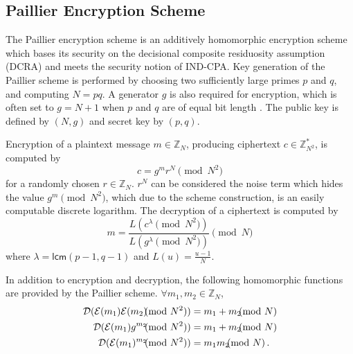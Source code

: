 \documentclass[twocolumn]{autart}
\begin{document}
% 
% 

\subsection{Paillier Encryption Scheme} \label{subsec:paillier_scheme}
The Paillier encryption scheme \cite{paillierPublicKeyCryptosystemsBased1999} is an additively homomorphic encryption scheme which bases its security on the decisional composite residuosity assumption (DCRA) and meets the security notion of IND-CPA. Key generation of the Paillier scheme is performed by choosing two sufficiently large primes $p$ and $q$, and computing $N=pq$. A generator $g$ is also required for encryption, which is often set to $g=N+1$ when $p$ and $q$ are of equal bit length \cite{katzIntroductionModernCryptography2008}. The public key is defined by $(N, g)$ and secret key by $(p, q)$.

Encryption of a plaintext message $m \in \mathbb{Z}_N$, producing ciphertext $c \in \mathbb{Z}^{*}_{N^2}$, is computed by
\begin{equation}
    c = g^m r^N \pmod{N^2}
\end{equation}
for a randomly chosen $r \in \mathbb{Z}_{N}$. $r^N$ can be considered the noise term which hides the value $g^m \pmod{N^2}$, which due to the scheme construction, is an easily computable discrete logarithm. The decryption of a ciphertext is computed by
\begin{equation}
    m = \frac{L(c^\lambda\pmod{N^2})}{L(g^\lambda\pmod{N^2})} \pmod{N}
\end{equation}
where $\lambda = \mathsf{lcm}(p-1, q-1)$ and $L(u) = \frac{u-1}{N}$.

In addition to encryption and decryption, the following homomorphic functions are provided by the Paillier scheme. $\forall m_1,m_2 \in \mathbb{Z}_N$,
\begin{align}
    \mathcal{D}(\mathcal{E}(m_1)\mathcal{E}(m_2) \hspace{-7pt} \pmod{N^2}) &= m_1+m_2 \hspace{-7pt} \pmod{N} \\
    \mathcal{D}(\mathcal{E}(m_1)g^{m_2} \hspace{-7pt} \pmod{N^2}) &= m_1+m_2\hspace{-7pt}\pmod{N} \\
    \mathcal{D}(\mathcal{E}(m_1)^{m_2} \hspace{-7pt} \pmod{N^2}) &= m_1m_2 \hspace{-7pt} \pmod{N}\,. \label{eqn:paillier_hom_mult}
\end{align}
\end{document}
